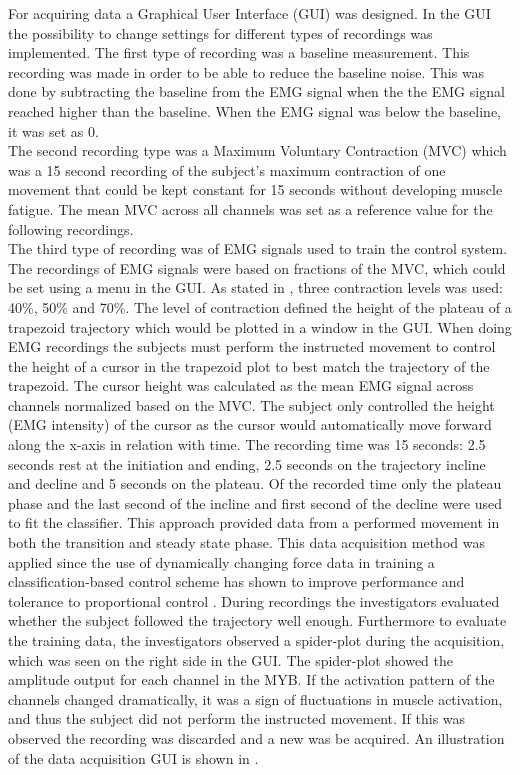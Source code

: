 For acquiring data a Graphical User Interface (GUI) was designed. In the GUI the possibility to change settings for different types of recordings was implemented. The first type of recording was a baseline measurement. This recording was made in order to be able to reduce the baseline noise. This was done by subtracting the baseline from the EMG signal when the the EMG signal reached higher than the baseline. When the EMG signal was below the baseline, it was set as 0. \\
The second recording type was a Maximum Voluntary Contraction (MVC) which was a 15 second recording of the subject's maximum contraction of one movement that could be kept constant for 15 seconds without developing muscle fatigue. The mean MVC across all channels was set as a reference value for the following recordings. \\
The third type of recording was of EMG signals used to train the control system. The recordings of EMG signals were based on fractions of the MVC, which could be set using a menu in the GUI. As stated in , three contraction levels was used: 40\%, 50\% and 70\%. The level of contraction defined the height of the plateau of a trapezoid trajectory which would be plotted in a window in the GUI. When doing EMG recordings the subjects must perform the instructed movement to control the height of a cursor in the trapezoid plot to best match the trajectory of the trapezoid. The cursor height was calculated as the mean EMG signal across channels normalized based on the MVC. The subject only controlled the height (EMG intensity) of the cursor as the cursor would automatically move forward along the x-axis in relation with time. The recording time was 15 seconds: 2.5 seconds rest at the initiation and ending, 2.5 seconds on the trajectory incline and decline and 5 seconds on the plateau. Of the recorded time only the plateau phase and the last second of the incline and first second of the decline were used to fit the classifier. This approach provided data from a performed movement in both the transition and steady state phase. This data acquisition method was applied since the use of dynamically changing force data in training a classification-based control scheme has shown to improve performance and tolerance to proportional control \cite{Scheme2015}. 
During recordings the investigators evaluated whether the subject followed the trajectory well enough. Furthermore to evaluate the training data, the investigators observed a spider-plot during the acquisition, which was seen on the right side in the GUI. The spider-plot showed the amplitude output for each channel in the MYB. If the activation pattern of the channels changed dramatically, it was a sign of fluctuations in muscle activation, and thus the subject did not perform the instructed movement. If this was observed the recording was discarded and a new was be acquired. An illustration of the data acquisition GUI is shown in .

